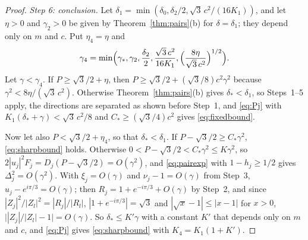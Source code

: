 \documentclass[11pt]{article}
\theoremstyle{definition}
\begin{document}
\begin{proof}
\emph{Step 6: conclusion.} Let $\delta_1 = \min(\delta_0, \delta_2/2, \sqrt{3}\,c^2/(16K_1))$, and let $\eta > 0$ and $\gamma_2 > 0$ be given by Theorem~\ref{thm:pairs}(b) for $\delta = \delta_1$; they depend only on $m$ and $c$. Put $\eta_4 = \eta$ and
\[
  \gamma_4 = \min\Bigl(\gamma_*, \gamma_2, \frac{\delta_2}{2}, \frac{\sqrt{3}\,c^2}{16K_1}, \Bigl(\frac{8\eta}{\sqrt{3}\,c^2}\Bigr)^{1/2}\Bigr).
\]
Let $\gamma < \gamma_4$. If $P \ge \sqrt{3}/2 + \eta$, then $P \ge \sqrt{3}/2 + (\sqrt{3}/8)c^2\gamma^2$ because $\gamma^2 < 8\eta/(\sqrt{3}\,c^2)$. Otherwise Theorem~\ref{thm:pairs}(b) gives $\delta_* < \delta_1$, so Steps~1--5 apply, the directions are separated as shown before Step~1, and \eqref{eq:Pj} with $K_1(\delta_* + \gamma) < \sqrt{3}\,c^2/8$ and $C_* \ge (\sqrt{3}/4)c^2$ gives \eqref{eq:fixedbound}.

Now let also $P < \sqrt{3}/2 + \eta_4$, so that $\delta_* < \delta_1$. If $P - \sqrt{3}/2 \ge C_*\gamma^2$, \eqref{eq:sharpbound} holds. Otherwise $0 < P - \sqrt{3}/2 < C_*\gamma^2 \le K\gamma^2$, so $2|u_j|^2F_j = D_j(P - \sqrt{3}/2) = O(\gamma^2)$, and \eqref{eq:pairexp} with $1 - h_j \ge 1/2$ gives $\Delta_j^2 = O(\gamma^2)$. With $\xi_j = O(\gamma)$ and $\nu_j - 1 = O(\gamma)$ from Step~3, $u_j - e^{i\pi/3} = O(\gamma)$; then $R_j = 1 + e^{-i\pi/3} + O(\gamma)$ by Step~2, and since $|Z_j|^2/|Z_l|^2 = |R_j|/|R_l|$, $|1 + e^{-i\pi/3}| = \sqrt{3}$ and $|\sqrt{x} - 1| \le |x - 1|$ for $x > 0$, $\bigl||Z_j|/|Z_l| - 1\bigr| = O(\gamma)$. So $\delta_* \le K'\gamma$ with a constant $K'$ that depends only on $m$ and $c$, and \eqref{eq:Pj} gives \eqref{eq:sharpbound} with $K_4 = K_1(1 + K')$.
\end{proof}
\end{document}
